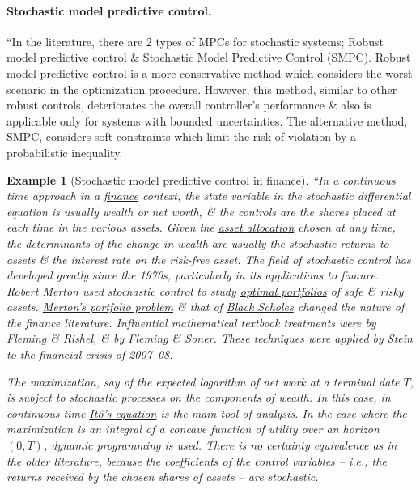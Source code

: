 \documentclass{article}
\newtheorem{example}{Example}
\begin{document}
\paragraph{Stochastic model predictive control.} ``In the literature, there are 2 types of MPCs for stochastic systems; Robust model predictive control \& Stochastic Model Predictive Control (SMPC). Robust model predictive control is a more conservative method which considers the worst scenario in the optimization procedure. However, this method, similar to other robust controls, deteriorates the overall controller's performance \& also is applicable only for systems with bounded uncertainties. The alternative method, SMPC, considers soft constraints which limit the risk of violation by a probabilistic inequality.

\begin{example}[Stochastic model predictive control in finance]
	``In a continuous time approach in a \href{https://en.wikipedia.org/wiki/Finance}{finance} context, the state variable in the stochastic differential equation is usually wealth or net worth, \& the controls are the shares placed at each time in the various assets. Given the \href{https://en.wikipedia.org/wiki/Asset_allocation}{asset allocation} chosen at any time, the determinants of the change in wealth are usually the stochastic returns to assets \& the interest rate on the risk-free asset. The field of stochastic control has developed greatly since the 1970s, particularly in its applications to finance. Robert Merton used stochastic control to study \href{https://en.wikipedia.org/wiki/Optimal_portfolio}{optimal portfolios} of safe \& risky assets. \href{https://en.wikipedia.org/wiki/Merton%27s_portfolio_problem}{Merton's portfolio problem} \& that of \href{https://en.wikipedia.org/wiki/Black%E2%80%93Scholes_model}{Black Scholes} changed the nature of the finance literature. Influential mathematical textbook treatments were by Fleming \& Rishel, \& by Fleming \& Soner. These techniques were applied by Stein to the \href{https://en.wikipedia.org/wiki/Financial_crisis_of_2007%E2%80%9308}{financial crisis of 2007--08}.

	The maximization, say of the expected logarithm of net work at a terminal date $T$, is subject to stochastic processes on the components of wealth. In this case, in continuous time \href{https://en.wikipedia.org/wiki/It%C3%B4%27s_lemma}{It\^o's equation} is the main tool of analysis. In the case where the maximization is an integral of a concave function of utility over an horizon $(0,T)$, dynamic programming is used. There is no certainty equivalence as in the older literature, because the coefficients of the control variables -- i.e., the returns received by the chosen shares of assets -- are stochastic.
\end{example}
\end{document}
